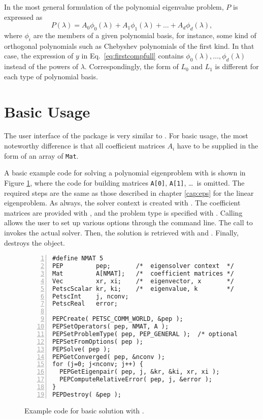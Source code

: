 In the most general formulation of the polynomial eigenvalue problem, $P$ is expressed as
\begin{equation}
\label{eq:pepnonmon}
P(\lambda)=A_0\phi_0(\lambda)+A_1\phi_1(\lambda)+\dots+A_d\phi_d(\lambda),
\end{equation}
where $\phi_i$ are the members of a given polynomial basis, for instance, some kind of orthogonal polynomials such as Chebyshev polynomials of the first kind. In that case, the expression of $y$ in Eq.\ \ref{eq:firstcompfull} contains $\phi_0(\lambda),\dots,\phi_d(\lambda)$ instead of the powers of $\lambda$. Correspondingly, the form of $L_0$ and $L_1$ is different for each type of polynomial basis.

\section{Basic Usage}

The user interface of the  package is very similar to . For basic usage, the most noteworthy difference is that all coefficient matrices $A_i$ have to be supplied in the form of an array of \texttt{Mat}.

A basic example code for solving a polynomial eigenproblem with  is shown in Figure \ref{fig:ex-pep}, where the code for building matrices \texttt{A[0]}, \texttt{A[1]}, \ldots\ is omitted. The required steps are the same as those described in chapter \ref{cap:eps} for the linear eigenproblem. As always, the solver context is created with . The coefficient matrices are provided with , and the problem type is specified with . Calling  allows the user to set up various options through the command line. The call to  invokes the actual solver. Then, the solution is retrieved with  and . Finally,  destroys the object.

\begin{figure}
\begin{Verbatim}[fontsize=\small,numbers=left,numbersep=6pt,xleftmargin=15mm]
#define NMAT 5
PEP         pep;       /*  eigensolver context  */
Mat         A[NMAT];   /*  coefficient matrices */
Vec         xr, xi;    /*  eigenvector, x       */
PetscScalar kr, ki;    /*  eigenvalue, k        */
PetscInt    j, nconv;
PetscReal   error;

PEPCreate( PETSC_COMM_WORLD, &pep );
PEPSetOperators( pep, NMAT, A );
PEPSetProblemType( pep, PEP_GENERAL );  /* optional */
PEPSetFromOptions( pep );
PEPSolve( pep );
PEPGetConverged( pep, &nconv );
for (j=0; j<nconv; j++) {
  PEPGetEigenpair( pep, j, &kr, &ki, xr, xi );
  PEPComputeRelativeError( pep, j, &error );
}
PEPDestroy( &pep );
\end{Verbatim}
\caption{\label{fig:ex-pep}Example code for basic solution with .}
\end{figure}


